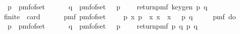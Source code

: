 \begin{isabellebody}
\ \ \ \ p\ {\isasymleftarrow}\ pmf{\isacharunderscore}{\kern0pt}of{\isacharunderscore}{\kern0pt}set\ {\isasymK}{\isacharsemicolon}{\kern0pt}\ \isanewline
\ \ \ \ q\ {\isasymleftarrow}\ pmf{\isacharunderscore}{\kern0pt}of{\isacharunderscore}{\kern0pt}set\ {\isacharparenleft}{\kern0pt}{\isasymK}\ {\isacharminus}{\kern0pt}\ {\isacharbraceleft}{\kern0pt}p{\isacharbraceright}{\kern0pt}{\isacharparenright}{\kern0pt}{\isacharsemicolon}{\kern0pt}\isanewline
\ \ \ \ return{\isacharunderscore}{\kern0pt}pmf\ {\isacharparenleft}{\kern0pt}key{\isacharunderscore}{\kern0pt}gen\ p\ q{\isacharparenright}{\kern0pt}\isanewline
\ \ {\isacharbraceright}{\kern0pt}{\isachardoublequoteclose}\isanewline
\isanewline
\isanewline
{}\isamarkupfalse%
\ \isanewline
\ \ \ {\isachardoublequoteopen}finite\ {\isasymK}{\isachardoublequoteclose}\ {\isachardoublequoteopen}card\ {\isasymK}\ {\isachargreater}{\kern0pt}\ {}{\isachardoublequoteclose}\isanewline
\ \ \ {\isachardoublequoteopen}pmf\ {\isacharparenleft}{\kern0pt}pmf{\isacharunderscore}{\kern0pt}of{\isacharunderscore}{\kern0pt}set\ {\isacharparenleft}{\kern0pt}{\isasymK}\ {\isasymtimes}\ {\isasymK}\ {\isacharminus}{\kern0pt}\ {\isacharbraceleft}{\kern0pt}p{\isachardot}{\kern0pt}\ {\isasymexists}x{\isachardot}{\kern0pt}\ p\ {\isacharequal}{\kern0pt}\ {\isacharparenleft}{\kern0pt}x{\isacharcomma}{\kern0pt}\ x{\isacharparenright}{\kern0pt}\ {\isasymand}\ x\ {\isasymin}\ {\isasymK}{\isacharbraceright}{\kern0pt}{\isacharparenright}{\kern0pt}{\isacharparenright}{\kern0pt}\ {\isacharparenleft}{\kern0pt}p{\isacharcomma}{\kern0pt}\ q{\isacharparenright}{\kern0pt}\ \isanewline
\ \ \ {\isacharequal}{\kern0pt}\ pmf\ {\isacharparenleft}{\kern0pt}do\ {\isacharbraceleft}{\kern0pt}\isanewline
\ \ \ \ p\ {\isasymleftarrow}\ pmf{\isacharunderscore}{\kern0pt}of{\isacharunderscore}{\kern0pt}set\ {\isasymK}{\isacharsemicolon}{\kern0pt}\ \isanewline
\ \ \ \ q\ {\isasymleftarrow}\ pmf{\isacharunderscore}{\kern0pt}of{\isacharunderscore}{\kern0pt}set\ {\isacharparenleft}{\kern0pt}{\isasymK}\ {\isacharminus}{\kern0pt}\ {\isacharbraceleft}{\kern0pt}p{\isacharbraceright}{\kern0pt}{\isacharparenright}{\kern0pt}{\isacharsemicolon}{\kern0pt}\isanewline
\ \ \ \ return{\isacharunderscore}{\kern0pt}pmf\ {\isacharparenleft}{\kern0pt}p{\isacharcomma}{\kern0pt}\ q{\isacharparenright}{\kern0pt}{\isacharbraceright}{\kern0pt}{\isacharparenright}{\kern0pt}\ {\isacharparenleft}{\kern0pt}p{\isacharcomma}{\kern0pt}\ q{\isacharparenright}{\kern0pt}{\isachardoublequoteclose}\isanewline
%
\isadelimproof
%
\endisadelimproof

\end{isabellebody}

